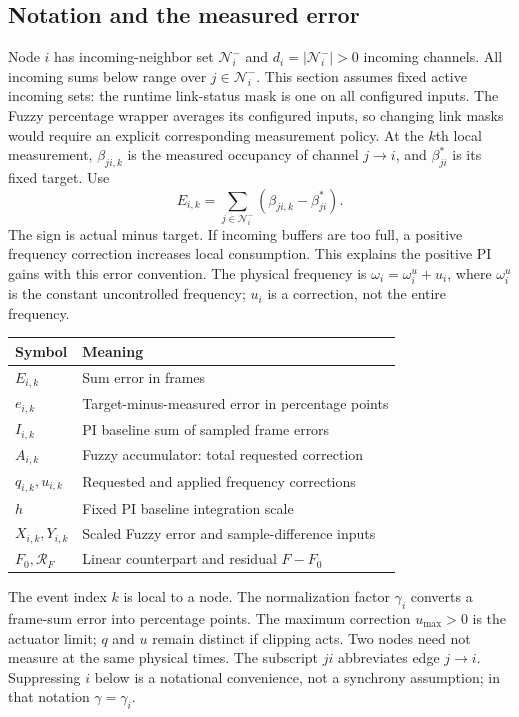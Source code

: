 \subsection{Notation and the measured error}

Node $i$ has incoming-neighbor set $\mathcal N_i^-$ and $d_i=|\mathcal N_i^-|>0$ incoming channels. All incoming sums below range over $j\in\mathcal N_i^-$. This section assumes fixed active
incoming sets: the runtime link-status mask is one on all configured inputs.
The Fuzzy percentage wrapper averages its configured inputs, so changing
link masks would require an explicit corresponding measurement policy.
At the $k$th local measurement,
$\beta_{ji,k}$ is the measured occupancy of channel $j\to i$, and
$\beta^*_{ji}$ is its fixed target. Use
\begin{equation}
 E_{i,k}=\sum_{j\in\mathcal N_i^-}(\beta_{ji,k}-\beta^*_{ji}).
 \label{detail:eq:fpi_error}
\end{equation}
The sign is actual minus target. If incoming buffers are too full, a
positive frequency correction increases local consumption. This explains
the positive PI gains with this error convention. The physical frequency is $\omega_i=\omega_i^u+u_i$, where $\omega_i^u$ is the constant uncontrolled frequency; $u_i$ is a correction, not the entire frequency.

\begin{center}
\begin{tabular}{@{}ll@{}}
\toprule
Symbol & Meaning \\
\midrule
$E_{i,k}$ & Sum error in frames \\
$e_{i,k}$ & Target-minus-measured error in percentage points \\
$I_{i,k}$ & PI baseline sum of sampled frame errors \\
$A_{i,k}$ & Fuzzy accumulator: total requested correction \\
$q_{i,k},u_{i,k}$ & Requested and applied frequency corrections \\
$h$ & Fixed PI baseline integration scale \\
$X_{i,k},Y_{i,k}$ & Scaled Fuzzy error and sample-difference inputs \\
$F_0,\mathcal R_F$ & Linear counterpart and residual $F-F_0$ \\
\bottomrule
\end{tabular}
\end{center}

The event index $k$ is local to a node. The normalization factor $\gamma_i$ converts a frame-sum error into percentage points. The maximum correction $u_{\max}>0$ is the actuator limit; $q$ and $u$ remain distinct if clipping acts. Two nodes need not measure at the
same physical times. The subscript $ji$ abbreviates edge $j\to i$.
Suppressing $i$ below is a notational convenience, not a synchrony
assumption; in that notation $\gamma=\gamma_i$.

